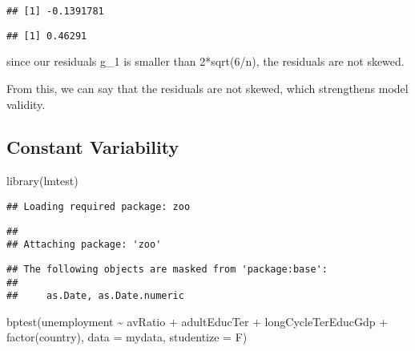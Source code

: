 \documentclass[
]{article}
\newenvironment{Shaded}{\begin{snugshade}}{\end{snugshade}}
\newcommand{\AttributeTok}[1]{\textcolor[rgb]{0.77,0.63,0.00}{#1}}
\newcommand{\DecValTok}[1]{\textcolor[rgb]{0.00,0.00,0.81}{#1}}
\newcommand{\FunctionTok}[1]{\textcolor[rgb]{0.00,0.00,0.00}{#1}}
\newcommand{\NormalTok}[1]{#1}
\newcommand{\SpecialCharTok}[1]{\textcolor[rgb]{0.00,0.00,0.00}{#1}}
\begin{document}
\begin{verbatim}
## [1] -0.1391781
\end{verbatim}

\begin{Shaded}
\end{Shaded}

\begin{verbatim}
## [1] 0.46291
\end{verbatim}

since our residuals g\_1 is smaller than 2*sqrt(6/n), the residuals are
not skewed.

From this, we can say that the residuals are not skewed, which
strengthens model validity.

\hypertarget{constant-variability}{%
\subsection{Constant Variability}\label{constant-variability}}

\begin{Shaded}
\begin{Highlighting}[]
\FunctionTok{library}\NormalTok{(lmtest)}
\end{Highlighting}
\end{Shaded}

\begin{verbatim}
## Loading required package: zoo
\end{verbatim}

\begin{verbatim}
## 
## Attaching package: 'zoo'
\end{verbatim}

\begin{verbatim}
## The following objects are masked from 'package:base':
## 
##     as.Date, as.Date.numeric
\end{verbatim}

\begin{Shaded}
\begin{Highlighting}[]
\FunctionTok{bptest}\NormalTok{(unemployment }\SpecialCharTok{\textasciitilde{}}\NormalTok{ avRatio }\SpecialCharTok{+}\NormalTok{ adultEducTer }\SpecialCharTok{+}\NormalTok{ longCycleTerEducGdp }\SpecialCharTok{+} \FunctionTok{factor}\NormalTok{(country), }\AttributeTok{data =}\NormalTok{ mydata, }\AttributeTok{studentize =}\NormalTok{ F)}
\end{Highlighting}
\end{Shaded}
\end{document}
